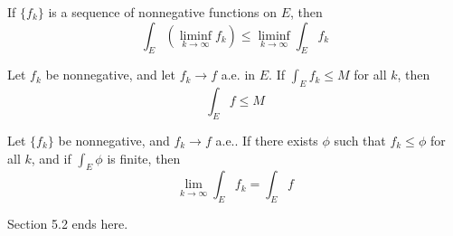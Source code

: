 \documentclass[openany]{book}
\begin{document}
\begin{thm}
    If $\{f_k\}$ is a sequence of nonnegative functions on $E$, then 
    \begin{equation*}
        \int_E(\liminf_{k\to\infty}f_k)\leq\liminf_{k\to\infty}\int_Ef_k
    \end{equation*}
\end{thm}
\begin{prop}
    Let $f_k$ be nonnegative, and let $f_k\to f$ a.e. in $E$. If $\int_Ef_k\leq M$ for all $k$, then 
    \begin{equation*}
        \int_E f\leq M
    \end{equation*}
\end{prop}
\begin{thm}
    Let $\{f_k\}$ be nonnegative, and $f_k\to f$ a.e.. If there exists $\phi$ such that $f_k\leq\phi$ for all $k$, and if $\int_E\phi$ is finite, then 
    \begin{equation*}
        \lim_{k\to\infty}\int_Ef_k=\int_Ef
    \end{equation*}
\end{thm}

Section 5.2 ends here.
\end{document}
